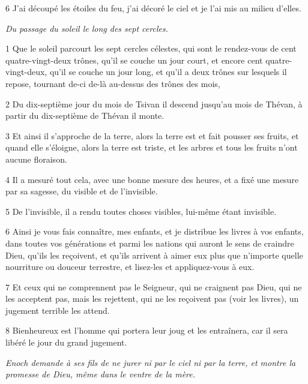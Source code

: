 \par 6 J'ai découpé les étoiles du feu, j'ai décoré le ciel et je l'ai mis au milieu d'elles.


\par \textit{Du passage du soleil le long des sept cercles.}

\par 1 Que le soleil parcourt les sept cercles célestes, qui sont le rendez-vous de cent quatre-vingt-deux trônes, qu'il se couche un jour court, et encore cent quatre-vingt-deux, qu'il se couche un jour long, et qu'il a deux trônes sur lesquels il repose, tournant de-ci de-là au-dessus des trônes des mois,

\par 2 Du dix-septième jour du mois de Tsivan il descend jusqu'au mois de Thévan, à partir du dix-septième de Thévan il monte.

\par 3 Et ainsi il s'approche de la terre, alors la terre est et fait pousser ses fruits, et quand elle s'éloigne, alors la terre est triste, et les arbres et tous les fruits n'ont aucune floraison.

\par 4 Il a mesuré tout cela, avec une bonne mesure des heures, et a fixé une mesure par sa sagesse, du visible et de l'invisible.

\par 5 De l'invisible, il a rendu toutes choses visibles, lui-même étant invisible.

\par 6 Ainsi je vous fais connaître, mes enfants, et je distribue les livres à vos enfants, dans toutes vos générations et parmi les nations qui auront le sens de craindre Dieu, qu'ils les reçoivent, et qu'ils arrivent à aimer eux plus que n'importe quelle nourriture ou douceur terrestre, et lisez-les et appliquez-vous à eux.

\par 7 Et ceux qui ne comprennent pas le Seigneur, qui ne craignent pas Dieu, qui ne les acceptent pas, mais les rejettent, qui ne les reçoivent pas (voir les livres), un jugement terrible les attend.

\par 8 Bienheureux est l'homme qui portera leur joug et les entraînera, car il sera libéré le jour du grand jugement.


\par \textit{Enoch demande à ses fils de ne jurer ni par le ciel ni par la terre, et montre la promesse de Dieu, même dans le ventre de la mère.}

